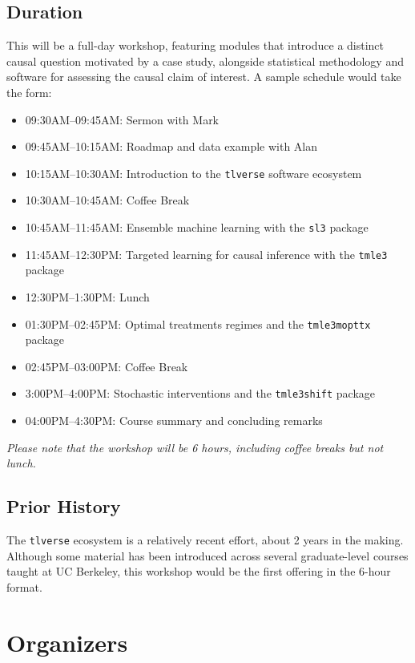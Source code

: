 \documentclass[a4paper,11pt]{texMemo}
\begin{document}
\subsection{Duration}

This will be a full-day workshop, featuring modules that introduce a distinct
causal question motivated by a case study, alongside statistical methodology and
software for assessing the causal claim of interest. A sample schedule would
take the form:
\begin{itemize}
  \itemsep0pt
  \item 09:30AM--09:45AM: Sermon with Mark
  \item 09:45AM--10:15AM: Roadmap and data example with Alan
  \item 10:15AM--10:30AM: Introduction to the \texttt{tlverse} software
    ecosystem
  \item 10:30AM--10:45AM: Coffee Break
  \item 10:45AM--11:45AM: Ensemble machine learning with the \texttt{sl3}
    package
  \item 11:45AM--12:30PM: Targeted learning for causal inference with the
    \texttt{tmle3} package
  \item 12:30PM--1:30PM: Lunch
  \item 01:30PM--02:45PM: Optimal treatments regimes and the
    \texttt{tmle3mopttx} package
  \item 02:45PM--03:00PM: Coffee Break
  \item 3:00PM--4:00PM: Stochastic interventions and the \texttt{tmle3shift}
    package
  \item 04:00PM--4:30PM: Course summary and concluding remarks
\end{itemize}
\textit{Please note that the workshop will be 6 hours, including coffee breaks
but not lunch.}

\subsection{Prior History}

The \texttt{tlverse} ecosystem is a relatively recent effort, about 2 years in
the making. Although some material has been introduced across several
graduate-level courses taught at UC Berkeley, this workshop would be the first
offering in the 6-hour format.

\section{Organizers}
\end{document}
